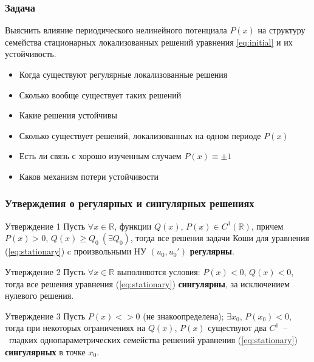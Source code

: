 \documentclass [10pt] {beamer}
\newcommand{\qu}{\scalebox{1.25}{\bf {\color{ceruleanblue} ?}}}
\begin{document}
\begin{frame}
	\frametitle{Задача}
	
	Выяснить влияние периодического нелинейного потенциала $P(x)$ на структуру семейства стационарных локализованных решений уравнения \eqref{eq:initial} и их устойчивость.
	
	\begin{itemize}
		\item Когда существуют регулярные локализованные решения\qu
		\item Сколько вообще существует таких решений\qu
		\item Какие решения устойчивы\qu
		\item Сколько существует решений, локализованных на одном периоде $P(x)$\qu
		\item Есть ли связь с хорошо изученным случаем $P(x) \equiv \pm 1$\qu
		\item Каков механизм потери устойчивости\qu
	\end{itemize}
	
\end{frame}

\begin{frame}
	\frametitle{Утверждения о регулярных и сингулярных решениях}

	\begin{block}{Утверждение 1}
		Пусть $\forall x \in \mathbb{R}$, функции $Q(x)$, $P(x) \in C^1(\mathbb{R})$, причем $P(x) > 0$, $Q(x) \ge Q_0~(\exists Q_0)$, тогда все решения задачи Коши для уравнения (\ref{eq:stationary}) c произвольными НУ $(u_0, u_0')$ {\bf регулярны}\footnotemark[2]. 
	\end{block}

	\begin{block}{Утверждение 2}
		Пусть $\forall x \in \mathbb{R}$ выполняются условия: $P(x) < 0$, $Q(x) < 0$, тогда все решения уравнения (\ref{eq:stationary}) {\bf сингулярны}, за исключением нулевого решения\footnotemark[2].
	\end{block}

	\begin{block}{Утверждение 3}
		Пусть $P(x) <> 0$ (не знакоопределена); $\exists x_0$, $P(x_0) < 0$, тогда при некоторых ограничениях на $Q(x)$, $P(x)$ существуют два $C^1$~--~гладких однопараметрических семейства решений уравнения (\ref{eq:stationary}) {\bf сингулярных} в точке $x_0$\footnotemark[2].
	\end{block}

\end{frame}
\end{document}
